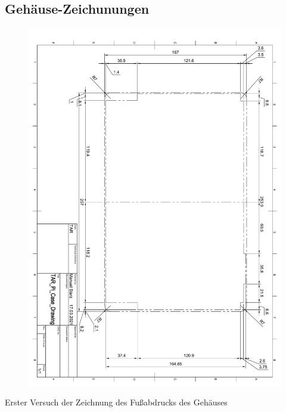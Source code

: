 \subsection{Gehäuse-Zeichunungen}
\begin{figure}[ht!]
	\includegraphics*[width=1\textwidth, page=1]{pdf/gehäuse_zeichnung_fußabdruck_v1.pdf}
 	\label{case_footprint}
\end{figure}
\begin{center}
Erster Versuch der Zeichnung des Fußabdrucks des Gehäuses
\end{center}
\newpage
